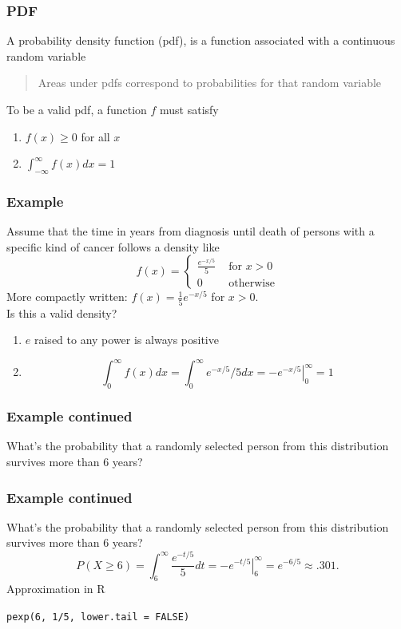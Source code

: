 \documentclass[aspectratio=169]{beamer}
\begin{document}
\begin{frame}
\frametitle{PDF}
  A probability density function (pdf), is a function associated with
  a continuous random variable 
  \begin{quote}
    Areas under pdfs correspond to
probabilities for that random variable
  \end{quote}
 To be a valid pdf, a
 function $f$ must satisfy
\begin{enumerate}
\item $f(x) \geq 0$ for all $x$
\item $\int_{-\infty}^{\infty} f(x)dx = 1$
\end{enumerate}
\end{frame}

\begin{frame}
\frametitle{Example}
Assume that the time in years from diagnosis until death of persons
with a specific kind of cancer follows a density like
$$
f(x) = \left\{\begin{array}{ll}
    \frac{e^{-x/5}}{5} & \mbox{ for } x > 0 \\
    0                 & \mbox{ otherwise} 
\end{array} \right. 
$$
More compactly written: $f(x) = \frac{1}{5}e^{-x/5}$ for $x>0$. \\
Is this a valid density?\\
\begin{enumerate}
\item $e$ raised to any power is always positive
\item 
$$
\int_{0}^\infty f(x) dx = \int_{0}^\infty e^{-x/5} / 5 dx = \left. -e^{-x/5} \right|^{\infty}_0 = 1
$$
\end{enumerate}
\end{frame}


\begin{frame}
\frametitle{Example continued}
What's the probability that a randomly selected person from this distribution 
survives more than 6 years?
\end{frame}

\begin{frame}
\frametitle{Example continued}
What's the probability that a randomly selected person from this distribution 
survives more than 6 years?
$$
P(X \geq 6) = \int_6^\infty  \frac{e^{-t/5}}{5}dt =  \left. -e^{-t/5} \right|_{6}^\infty = e^{-6/5} \approx .301.
$$
Approximation in R 
\begin{center}
  \texttt{pexp(6, 1/5, lower.tail = FALSE)}  
\end{center}
\end{frame}
\end{document}
